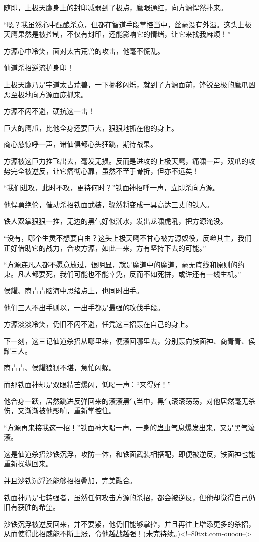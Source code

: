 \begin{this_body}
随即，上极天鹰身上的封印减弱到了极点，鹰眼通红，向方源悍然扑来。

“嗯？我虽然心中酝酿杀意，但都在智道手段掌控当中，丝毫没有外溢。这头上极天鹰果然是被控制，不仅有封印，还能影响它的情绪，让它来找我麻烦！”

方源心中冷笑，面对太古荒兽的攻击，他毫不慌乱。

仙道杀招逆流护身印！

上极天鹰乃是宇道太古荒兽，一下挪移闪烁，就到了方源面前，锋锐至极的鹰爪凶恶至极地向方源面庞抓来。

方源不闪不避，硬抗这一击！

巨大的鹰爪，比他全身还要巨大，狠狠地抓在他的身上。

商心慈惊呼一声，诸仙俱都心头狂跳，期待战果。

方源被这巨力推飞出去，毫发无损。反而是进攻的上极天鹰，痛啸一声，双爪的攻势完全被逆反，让它痛彻心扉，虽然不至于骨折，但亦不远矣！

“我们进攻，此时不攻，更待何时？”铁面神招呼一声，立即杀向方源。

他悍勇绝伦，催动杀招铁面武装，骤然将变成一具高达三丈的铁人。

铁人双掌狠狠一推，无边的黑气好似潮水，发出龙啸虎吼，把方源淹没。

“没有，哪个生灵不想要自由？这头上极天鹰不甘心被方源奴役，反噬其主，我们正好借助它的战力，合攻方源，如此一来，方有坚持下去的可能。”

“方源连凡人都不愿意放过，很明显，就是魔道中的魔道，毫无底线和原则的约束。凡人都要死，我们可能也不能幸免，反而不如死拼，或许还有一线生机。”

侯耀、商青青脑海中思绪点上，也同时出手。

他们三人不出手则以，一出手都是最强的攻伐手段。

方源淡淡冷笑，仍旧不闪不避，任凭这三招轰在自己的身上。

下一刻，这三记仙道杀招从哪里来，便滚回哪里去，分别轰向铁面神、商青青、侯耀三人。

商青青、侯耀狼狈不堪，急忙闪躲。

而那铁面神却是双眼精芒爆闪，低喝一声：“来得好！”

他合身一跃，居然跳进反弹回来的滚滚黑气当中，黑气滚滚荡荡，对他居然毫无杀伤，又渐渐被他影响，重新掌控住。

“方源再来接我这一招！”铁面神大喝一声，一身的蛊虫气息爆发出来，又是黑气滚滚。

这是仙道杀招沙铁沉浮，攻防一体，和铁面武装相搭配，即便被逆反，铁面神也能重新操纵回来。

并且沙铁沉浮还能够招招叠加，完美融合。

铁面神乃是七转强者，虽然任何攻击方源的杀招，都会被逆反，但他却觉得自己仍旧有获胜的希望。

沙铁沉浮被逆反回来，并不要紧，他仍旧能够掌控，并且再往上增添更多的杀招，从而使得此招威能不断上涨，令他越战越强！(未完待续。)<!--80txt.com-ouoou-->

\end{this_body}


